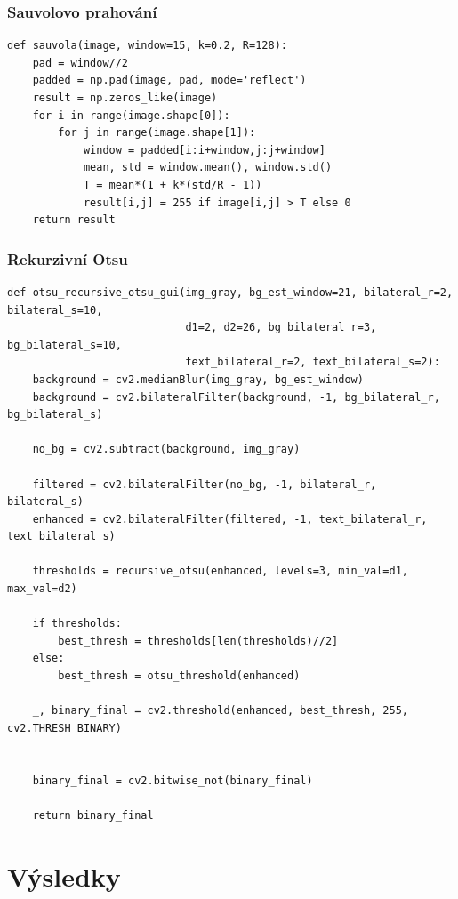 \documentclass[12pt,a4paper]{article}
\begin{document}
\subsubsection{Sauvolovo prahování}
\begin{verbatim}
def sauvola(image, window=15, k=0.2, R=128):
    pad = window//2
    padded = np.pad(image, pad, mode='reflect')
    result = np.zeros_like(image)
    for i in range(image.shape[0]):
        for j in range(image.shape[1]):
            window = padded[i:i+window,j:j+window]
            mean, std = window.mean(), window.std()
            T = mean*(1 + k*(std/R - 1))
            result[i,j] = 255 if image[i,j] > T else 0
    return result
\end{verbatim}

\subsubsection{Rekurzivní Otsu}
\begin{verbatim}
def otsu_recursive_otsu_gui(img_gray, bg_est_window=21, bilateral_r=2, bilateral_s=10,
                            d1=2, d2=26, bg_bilateral_r=3, bg_bilateral_s=10,
                            text_bilateral_r=2, text_bilateral_s=2):
    background = cv2.medianBlur(img_gray, bg_est_window)
    background = cv2.bilateralFilter(background, -1, bg_bilateral_r, bg_bilateral_s)

    no_bg = cv2.subtract(background, img_gray)

    filtered = cv2.bilateralFilter(no_bg, -1, bilateral_r, bilateral_s)
    enhanced = cv2.bilateralFilter(filtered, -1, text_bilateral_r, text_bilateral_s)

    thresholds = recursive_otsu(enhanced, levels=3, min_val=d1, max_val=d2)

    if thresholds:
        best_thresh = thresholds[len(thresholds)//2]
    else:
        best_thresh = otsu_threshold(enhanced)

    _, binary_final = cv2.threshold(enhanced, best_thresh, 255, cv2.THRESH_BINARY)


    binary_final = cv2.bitwise_not(binary_final)

    return binary_final
\end{verbatim}



\section{Výsledky}
\end{document}
